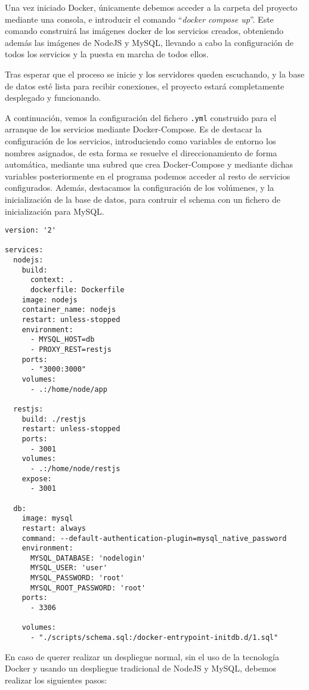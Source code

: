 Una vez iniciado Docker, únicamente debemos acceder a la carpeta del
proyecto mediante una consola, e introducir el comando ``\emph{docker
  compose up}''. Este comando construirá las imágenes docker de los
servicios creados, obteniendo además las imágenes de NodeJS y MySQL,
llevando a cabo la configuración de todos los servicios y la puesta en
marcha de todos ellos.

Tras esperar que el proceso se inicie y los servidores queden escuchando, y
la base de datos esté lista para recibir conexiones, el proyecto estará
completamente desplegado y funcionando.

A continuación, vemos la configuración del fichero {\tt .yml} construido
para el arranque de los servicios mediante Docker-Compose. Es de destacar
la configuración de los servicios, introduciendo como variables de entorno
los nombres asignados, de esta forma se resuelve el direccionamiento de
forma automática, mediante una subred que crea Docker-Compose y mediante
dichas variables posteriormente en el programa podemos acceder al resto de
servicios configurados. Además, destacamos la configuración de los
volúmenes, y la inicialización de la base de datos, para contruir el schema
con un fichero de inicialización para MySQL.


\begin{lstlisting}
version: '2'

services:
  nodejs:
    build:
      context: .
      dockerfile: Dockerfile
    image: nodejs
    container_name: nodejs
    restart: unless-stopped
    environment:
      - MYSQL_HOST=db
      - PROXY_REST=restjs
    ports:
      - "3000:3000"
    volumes:
      - .:/home/node/app

  restjs:
    build: ./restjs
    restart: unless-stopped
    ports:
      - 3001
    volumes:
      - .:/home/node/restjs
    expose:
      - 3001

  db:
    image: mysql
    restart: always
    command: --default-authentication-plugin=mysql_native_password
    environment:
      MYSQL_DATABASE: 'nodelogin'
      MYSQL_USER: 'user'
      MYSQL_PASSWORD: 'root'
      MYSQL_ROOT_PASSWORD: 'root'
    ports:
      - 3306

    volumes:
      - "./scripts/schema.sql:/docker-entrypoint-initdb.d/1.sql"
\end{lstlisting}



En caso de querer realizar un despliegue normal, sin el uso de la
tecnología Docker y usando un despliegue tradicional de NodeJS y MySQL,
debemos realizar los siguientes pasos:

